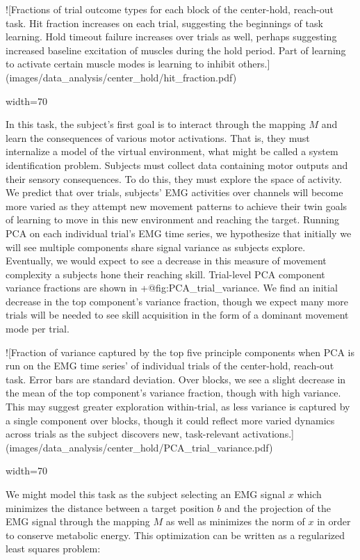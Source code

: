\documentclass[../main.tex]{subfiles}
\begin{document}
{{{{{{{{![Fractions of trial outcome types for each block of the center-hold, reach-out task. Hit fraction increases on each trial, suggesting the beginnings of task learning. Hold timeout failure increases over trials as well, perhaps suggesting increased baseline excitation of muscles during the hold period. Part of learning to activate certain muscle modes is learning to inhibit others.](images/data_analysis/center_hold/hit_fraction.pdf){width=70%

In this task, the subject's first goal is to interact through the mapping $M$ and learn the consequences of various motor activations. That is, they must internalize a model of the virtual environment, what might be called a system identification problem. Subjects must collect data containing motor outputs and their sensory consequences. To do this, they must explore the space of activity. We predict that over trials, subjects' EMG activities over channels will become more varied as they attempt new movement patterns to achieve their twin goals of learning to move in this new environment and reaching the target. Running PCA on each individual trial's EMG time series, we hypothesize that initially we will see multiple components share signal variance as subjects explore. Eventually, we would expect to see a decrease in this measure of movement complexity a subjects hone their reaching skill. Trial-level PCA component variance fractions are shown in {+@fig:PCA_trial_variance}. We find an initial decrease in the top component's variance fraction, though we expect many more trials will be needed to see skill acquisition in the form of a dominant movement mode per trial.

![Fraction of variance captured by the top five principle components when PCA is run on the EMG time series' of individual trials of the center-hold, reach-out task. Error bars are standard deviation. Over blocks, we see a slight decrease in the mean of the top component's variance fraction, though with high variance. This may suggest greater exploration within-trial, as less variance is captured by a single component over blocks, though it could reflect more varied dynamics across trials as the subject discovers new, task-relevant activations.](images/data_analysis/center_hold/PCA_trial_variance.pdf){width=70%

We might model this task as the subject selecting an EMG signal $x$ which minimizes the distance between a target position $b$ and the projection of the EMG signal through the mapping $M$ as well as minimizes the norm of $x$ in order to conserve metabolic energy. This optimization can be written as a regularized least squares problem:  

}}}}}}}}}}
\end{document}

